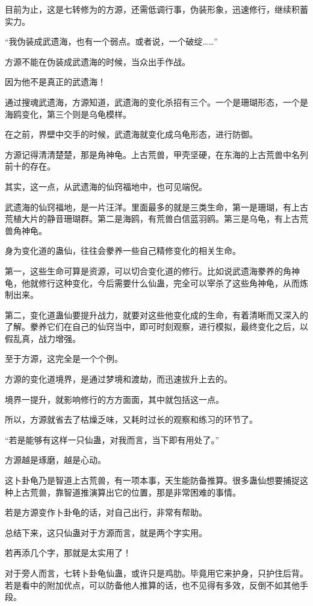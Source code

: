 \begin{this_body}
目前为止，这是七转修为的方源，还需低调行事，伪装形象，迅速修行，继续积蓄实力。

“我伪装成武遗海，也有一个弱点。或者说，一个破绽……”

方源不能在伪装成武遗海的时候，当众出手作战。

因为他不是真正的武遗海！

通过搜魂武遗海，方源知道，武遗海的变化杀招有三个。一个是珊瑚形态，一个是海鸥变化，第三个则是乌龟模样。

在之前，界壁中交手的时候，武遗海就变化成乌龟形态，进行防御。

方源记得清清楚楚，那是角神龟。上古荒兽，甲壳坚硬，在东海的上古荒兽中名列前十的存在。

其实，这一点，从武遗海的仙窍福地中，也可见端倪。

武遗海的仙窍福地，是一片汪洋。里面最多的就是三类生命，第一是珊瑚，有上古荒植大片的静音珊瑚群。第二是海鸥，有荒兽白信蓝羽鸥。第三是乌龟，有上古荒兽角神龟。

身为变化道的蛊仙，往往会豢养一些自己精修变化的相关生命。

第一，这些生命可算是资源，可以切合变化道的修行。比如说武遗海豢养的角神龟，他就修行这种变化，今后需要什么仙蛊，完全可以宰杀了这些角神龟，从而炼制出来。

第二，变化道蛊仙要提升战力，就要对这些他变化成的生命，有着清晰而又深入的了解。豢养它们在自己的仙窍当中，即可时刻观察，进行模拟，最终变化之后，以假乱真，战力增强。

至于方源，这完全是一个个例。

方源的变化道境界，是通过梦境和渡劫，而迅速拔升上去的。

境界一提升，就影响修行的方方面面，其中就包括这一点。

所以，方源就省去了枯燥乏味，又耗时过长的观察和练习的环节了。

“若是能够有这样一只仙蛊，对我而言，当下即有用处了。”

方源越是琢磨，越是心动。

这卜卦龟乃是智道上古荒兽，有一项本事，天生能防备推算。很多蛊仙想要捕捉这种上古荒兽，靠智道推演算出它的位置，那是非常困难的事情。

若是方源变作卜卦龟的话，对自己出行，非常有帮助。

总结下来，这只仙蛊对于方源而言，就是两个字实用。

若再添几个字，那就是太实用了！

对于旁人而言，七转卜卦龟仙蛊，或许只是鸡肋。毕竟用它来护身，只护住后背。若是看中的附加优点，可以防备他人推算的话，也不见得有多效，反倒不如其他手段。


\end{this_body}
